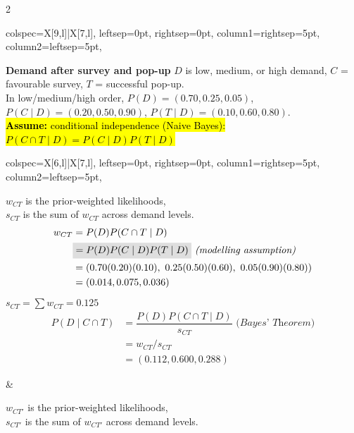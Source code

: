 \documentclass[12pt]{article}
\newcommand{\hlfancy}[2]{\sethlcolor{#1}\hl{#2}}
\newcommand{\hlfancymath}[2]{%
    \begingroup
    \mathchoice
        {\colorbox{#1}{$\displaystyle #2$}}%
        {\colorbox{#1}{$\textstyle #2$}}%
        {\colorbox{#1}{$\scriptstyle #2$}}%
        {\colorbox{#1}{$\scriptscriptstyle #2$}}%
    \endgroup
}
\begin{document}
\begin{paracol}{2}
\begin{tcolorbox}[title=Problems, width=\columnwidth]
		\begin{tblr}{
				colspec={X[9,l]|X[7,l]},
				leftsep=0pt,
				rightsep=0pt,
				column{1}={rightsep=5pt},
				column{2}={leftsep=5pt},
			}
			\begin{minipage}[t]{\linewidth}
				\textbf{Demand after survey and pop-up} \; $D$ is low, medium, or high demand, \; $C$ = favourable survey, \; $T$ = successful pop-up. \\
				In low/medium/high order, $P(D)=(0.70,0.25,0.05)$, $P(C\mid D)=(0.20,0.50,0.90)$, $P(T\mid D)=(0.10,0.60,0.80)$. \\
				\hlfancy{lightgray}{\textbf{Assume:} conditional independence (Naive Bayes): $P(C \cap T \mid D) = P(C \mid D)P(T \mid D)$} \\
				\begin{tblr}{
						colspec={X[6,l]|X[7,l]},
						leftsep=0pt,
						rightsep=0pt,
						column{1}={rightsep=5pt},
						column{2}={leftsep=5pt},
					}
					\begin{minipage}[t]{\linewidth}
						$w_{CT}$ is the prior-weighted likelihoods, \\
						$s_{CT}$ is the sum of $w_{CT}$ across demand levels.
						\begin{align*}
							w_{CT} & = P(D)P(C\cap T\mid D)                                                               \\
							       & \hlfancymath{lightgray}{= P(D)P(C\mid D)P(T\mid D)} \textit{ (modelling assumption)} \\
							       & = (0.70(0.20)(0.10),\ 0.25(0.50)(0.60),\ 0.05(0.90)(0.80))                           \\
							       & = (0.014,0.075,0.036)
						\end{align*}
						$s_{CT} = \sum w_{CT} = 0.125$
						\begin{align*}
							P(D\mid C \cap T) & = \dfrac{P(D)P(C\cap T\mid D)}{s_{CT}} \textit{ (Bayes' Theorem)} \\
							                  & = w_{CT} / s_{CT}                                                 \\
							                  & = (0.112,0.600,0.288)
						\end{align*}
					\end{minipage}
					 &
					\begin{minipage}[t]{\linewidth}
						$w_{CT'}$ is the prior-weighted likelihoods, \\
						$s_{CT'}$ is the sum of $w_{CT'}$ across demand levels.
						\begin{align*}

\end{align*}
\end{minipage}
\end{tblr}
\end{minipage}
\end{tblr}
\end{tcolorbox}
\end{paracol}
\end{document}
